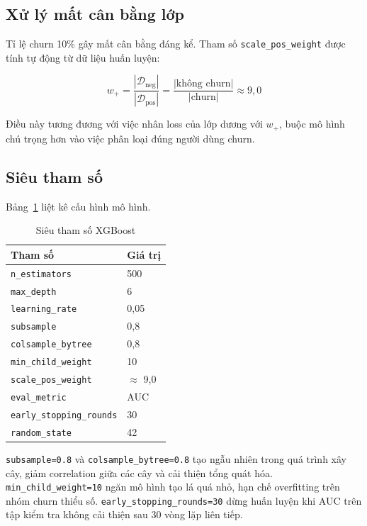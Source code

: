 \documentclass[conference]{IEEEtran}
\begin{document}
\subsection{Xử lý mất cân bằng lớp}

Tỉ lệ churn 10\% gây mất cân bằng đáng kể. Tham số \texttt{scale\_pos\_weight}
được tính tự động từ dữ liệu huấn luyện:

\begin{equation}
  w_+ = \frac{|\mathcal{D}_\text{neg}|}{|\mathcal{D}_\text{pos}|}
      = \frac{|\text{không churn}|}{|\text{churn}|} \approx 9{,}0
\end{equation}

Điều này tương đương với việc nhân loss của lớp dương với $w_+$, buộc mô
hình chú trọng hơn vào việc phân loại đúng người dùng churn.

\subsection{Siêu tham số}

Bảng~\ref{tab:hyperparams} liệt kê cấu hình mô hình.

\begin{table}[htbp]
\caption{Siêu tham số XGBoost}
\label{tab:hyperparams}
\centering
\begin{tabular}{ll}
\toprule
\textbf{Tham số} & \textbf{Giá trị} \\
\midrule
\texttt{n\_estimators}         & 500 \\
\texttt{max\_depth}            & 6 \\
\texttt{learning\_rate}        & 0,05 \\
\texttt{subsample}             & 0,8 \\
\texttt{colsample\_bytree}     & 0,8 \\
\texttt{min\_child\_weight}    & 10 \\
\texttt{scale\_pos\_weight}    & $\approx$ 9,0 \\
\texttt{eval\_metric}          & AUC \\
\texttt{early\_stopping\_rounds} & 30 \\
\texttt{random\_state}         & 42 \\
\bottomrule
\end{tabular}
\end{table}

\texttt{subsample=0.8} và \texttt{colsample\_bytree=0.8} tạo ngẫu nhiên trong
quá trình xây cây, giảm correlation giữa các cây và cải thiện tổng quát hóa.
\texttt{min\_child\_weight=10} ngăn mô hình tạo lá quá nhỏ, hạn chế
overfitting trên nhóm churn thiểu số. \texttt{early\_stopping\_rounds=30}
dừng huấn luyện khi AUC trên tập kiểm tra không cải thiện sau 30 vòng lặp
liên tiếp.
\end{document}

